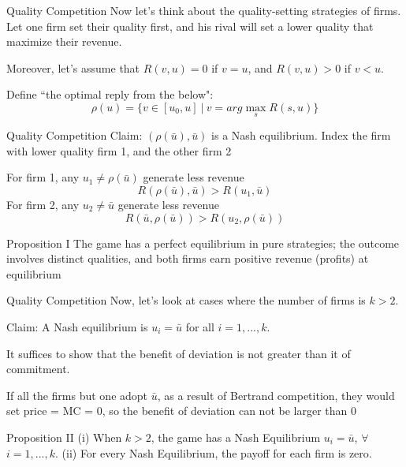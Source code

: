 \documentclass[10pt]{beamer}
\begin{document}
\begin{frame}{Quality Competition}
Now let's think about the quality-setting strategies of firms. Let one firm set their quality first, and his rival will set a lower quality that maximize their revenue. 

Moreover, let's assume that $R(v,u) = 0$ if $v = u$, and $R(v,u) > 0 $ if $v < u$.

Define ``the optimal reply from the below":
\begin{equation}
    \rho(u)= \{ v \in [u_0,u] \ | \ v = arg\max_s R(s,u) \}
\end{equation}

\end{frame}

\begin{frame}{Quality Competition}
Claim: $(\rho(\bar{u}), \bar{u})$ is a Nash equilibrium. Index the firm with lower quality firm 1, and the other firm 2

For firm 1, any $u_1 \neq  \rho(\bar{u})$ generate less revenue
\begin{equation}
    R(\rho(\bar{u}), \bar{u}) > R(u_1, \bar{u})
\end{equation}
For firm 2, any $u_2 \neq \bar{u}$ generate less revenue
\begin{equation}
    R(\bar{u}, \rho(\bar{u})) > R(u_2, \rho(\bar{u}))
\end{equation}

\begin{block}{Proposition I}
The game has a perfect equilibrium in pure strategies; the outcome involves distinct qualities, and both firms earn positive revenue (profits) at equilibrium
\end{block}
\end{frame}


\begin{frame}{Quality Competition}
Now, let's look at cases where the number of firms is $k > 2$.

Claim: A Nash equilibrium is $u_i = \bar{u}$ for all $i = 1,..., k$.

It suffices to show that the benefit of deviation is not greater than it of commitment.

If all the firms but one adopt $\bar{u}$, as a result of Bertrand competition, they would set price = MC = 0, so the benefit of deviation can not be larger than 0

\begin{block}{Proposition II}
(i) When $k > 2$, the game has a Nash Equilibrium $u_i = \bar{u}$, $\forall$ $i = 1,...,k$.
(ii) For every Nash Equilibrium, the payoff for each firm is zero.
\end{block}
\end{frame}
\end{document}
